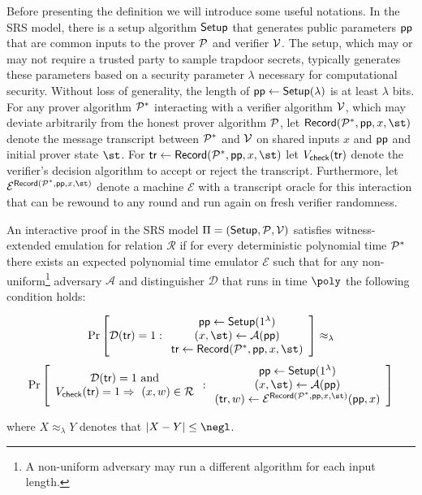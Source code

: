 Before presenting the definition we will introduce some useful notations. In the SRS model, there is a setup algorithm $\textsf{{Setup}}$ that generates public parameters $\textsf{pp}$ that are common inputs to the prover $\mathcal{P}$ and verifier $\mathcal{V}$. The setup, which may or may not require a trusted party to sample trapdoor secrets, typically generates these parameters based on a security parameter $\lambda$ necessary for computational security. Without loss of generality, the length of $\textsf{pp} \gets \textsf{{Setup}}(\lambda)$ is at least $\lambda$ bits. For any prover algorithm $\mathcal{P}^*$ interacting with a verifier algorithm $\mathcal{V}$, which may deviate arbitrarily from the honest prover algorithm $\mathcal{P}$, let $\textsf{Record}(\prover^*, \params, x, \st)$ denote the message transcript between $\mathcal{P}^*$ and $\mathcal{V}$ on shared inputs $x$ and $\textsf{pp}$ and initial prover state $\st$. For $\tr \gets \textsf{Record}(\prover^*, \params, x, \st)$ let $V_{\textsf{check}}(\textsf{{tr}})$ denote the verifier's decision algorithm to accept or reject the transcript. Furthermore, let $\mathcal{E}^{\textsf{Record}(\prover^*, \params, x, \st)}$ denote a machine $\mathcal{E}$ with a transcript oracle for this interaction that can be rewound to any round and run again on fresh verifier randomness.

\begin{definition}\label{def:wee} 
An interactive proof in the SRS model $\Pi = (\textsf{Setup}, \mathcal{P}, \mathcal{V})$ satisfies witness-extended emulation for relation $\mathcal{R}$ if for every deterministic polynomial time $\mathcal{P}^*$ there exists an expected polynomial time emulator $\mathcal{E}$ such that for any non-uniform\footnote{A non-uniform adversary may run a different algorithm for each input length.} adversary $\mathcal{A}$ and distinguisher $\mathcal{D}$ that runs in time $\poly$ the following condition holds: 
\begin{small}
\[
\Pr \left[
\mathcal{D}(\textsf{tr}) = 1
:
\begin{array}{c}
             \params \leftarrow \textsf{Setup}(1^\lambda) \\
             (x, \st) \leftarrow \mathcal{A}(\params) \\
             \tr \leftarrow \textsf{Record}(\prover^*, \params, x, \st)
\end{array} 
\right] \approx_\lambda
\]
\[
\Pr \left[
\begin{array}{c} 
\mathcal{D}(\textsf{tr}) = 1 \ \text{and} \\ 
V_{\textsf{check}}(\tr) = 1 \Rightarrow \ (x, w) \in \mathcal{R}
\end{array} 
:
\begin{array}{c}
             \params \leftarrow \textsf{Setup}(1^\lambda) \\
             (x, \st) \leftarrow \mathcal{A}(\params) \\
(\textsf{tr}, w) \leftarrow \mathcal{E}^{\textsf{Record}(\prover^*, \params, x, \st)}(\params, x)
\end{array}
\right]
\]
\end{small}
where $X \approx_\lambda Y$ denotes that $|X - Y| \leq \negl$. 
\end{definition}

